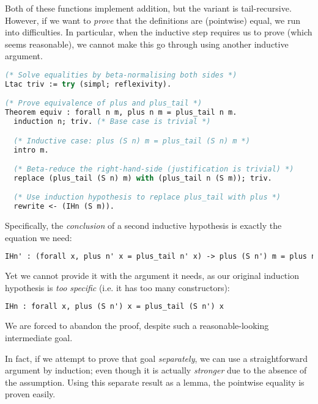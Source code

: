 Both of these functions implement addition, but the  variant is
tail-recursive. However, if we want to \emph{prove} that the definitions are
(pointwise) equal, we run into difficulties. In particular, when the inductive
step requires us to prove  (which seems
reasonable), we cannot make this go through using another inductive argument.

\begin{lstlisting}[language=ML, xleftmargin=.2\textwidth, xrightmargin=.2\textwidth]
(* Solve equalities by beta-normalising both sides *)
Ltac triv := try (simpl; reflexivity).

(* Prove equivalence of plus and plus_tail *)
Theorem equiv : forall n m, plus n m = plus_tail n m.
  induction n; triv. (* Base case is trivial *)

  (* Inductive case: plus (S n) m = plus_tail (S n) m *)
  intro m.

  (* Beta-reduce the right-hand-side (justification is trivial) *)
  replace (plus_tail (S n) m) with (plus_tail n (S m)); triv.

  (* Use induction hypothesis to replace plus_tail with plus *)
  rewrite <- (IHn (S m)).
\end{lstlisting}

Specifically, the \emph{conclusion} of a second inductive hypothesis is exactly
the equation we need:

\begin{lstlisting}[language=ML, xleftmargin=.2\textwidth, xrightmargin=.2\textwidth]
IHn' : (forall x, plus n' x = plus_tail n' x) -> plus (S n') m = plus n' (S m)
\end{lstlisting}

Yet we cannot provide it with the argument it needs, as our original induction
hypothesis is \emph{too specific} (i.e. it has too many  constructors):

\begin{lstlisting}[language=ML, xleftmargin=.2\textwidth, xrightmargin=.2\textwidth]
IHn : forall x, plus (S n') x = plus_tail (S n') x
\end{lstlisting}

We are forced to abandon the proof, despite such a reasonable-looking
intermediate goal.

In fact, if we attempt to prove that goal \emph{separately}, we can use a
straightforward argument by induction; even though it is actually
\emph{stronger} due to the absence of the  assumption. Using this
separate result as a lemma, the pointwise equality is proven easily.

